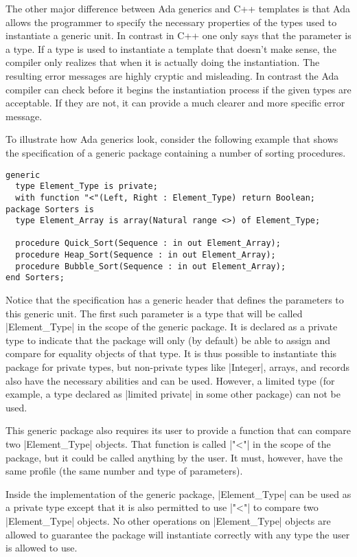 The other major difference between Ada generics and C++ templates is that Ada allows the
programmer to specify the necessary properties of the types used to instantiate a generic unit.
In contrast in C++ one only says that the parameter is a type. If a type is used to instantiate
a template that doesn't make sense, the compiler only realizes that when it is actually doing
the instantiation. The resulting error messages are highly cryptic and misleading. In contrast
the Ada compiler can check before it begins the instantiation process if the given types are
acceptable. If they are not, it can provide a much clearer and more specific error message.

To illustrate how Ada generics look, consider the following example that shows the specification
of a generic package containing a number of sorting procedures.

\begin{lstlisting}
generic
  type Element_Type is private;
  with function "<"(Left, Right : Element_Type) return Boolean;
package Sorters is
  type Element_Array is array(Natural range <>) of Element_Type;

  procedure Quick_Sort(Sequence : in out Element_Array);
  procedure Heap_Sort(Sequence : in out Element_Array);
  procedure Bubble_Sort(Sequence : in out Element_Array);
end Sorters;
\end{lstlisting}

Notice that the specification has a generic header that defines the parameters to this generic
unit. The first such parameter is a type that will be called |Element_Type| in the scope of the
generic package. It is declared as a private type to indicate that the package will only (by
default) be able to assign and compare for equality objects of that type. It is thus possible to
instantiate this package for private types, but non-private types like |Integer|, arrays, and
records also have the necessary abilities and can be used. However, a limited type (for example,
a type declared as |limited private| in some other package) can not be used.

This generic package also requires its user to provide a function that can compare two
|Element_Type| objects. That function is called |"<"| in the scope of the package, but it could
be called anything by the user. It must, however, have the same profile (the same number and
type of parameters).

Inside the implementation of the generic package, |Element_Type| can be used as a private type
except that it is also permitted to use |"<"| to compare two |Element_Type| objects. No other
operations on |Element_Type| objects are allowed to guarantee the package will instantiate
correctly with any type the user is allowed to use.

